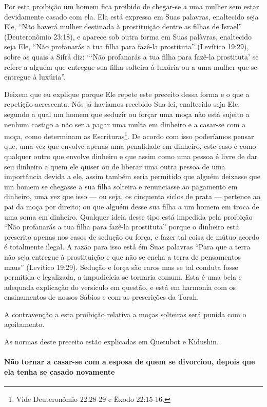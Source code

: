 Por esta proibição um homem fica proibido de chegar-se a uma mulher sem
estar devidamente casado com ela. Ela está expressa em Suas palavras,
enaltecido seja Ele, ``Não haverá mulher destinada à prostituição dentre
as filhas de Israel'' (Deuteronômio 23:18), e aparece sob outra forma
em Suas palàvras, enaltecido seja Ele, ``Não profanarás a tua filha
para fazê-la prostituta'' (Levítico 19:29), sobre as quais a Sifrá diz:
```Não profanarás a tua filha para fazê-la prostituta' se refere a
alguém que entregue sua filha solteira à luxúria ou a uma mulher que se
entregue à luxúria''.

Deixem que eu explique porque Ele repete este preceito dessa forma e o
que a repetição acrescenta. Nós já havíamos recebido Sua lei, enaltecido
seja Ele, segundo a qual um homem que seduzir ou forçar uma moça não
está sujeito a nenhum castigo a não ser a pagar uma multa em dinheiro e
a casar-se com a moça, como determinam as
Escrituras\footnote{Vide Deuteronômio 22:28-29 e Êxodo 22:15-16.}. De acordo com isso poderíamos pensar
que, uma vez que envolve apenas uma penalidade em dinheiro, este caso é
como qualquer outro que envolve dinheiro e que assim como uma pessoa é
livre de dar seu dinheiro a quem ele quiser ou de liberar uma outra
pessoa de uma importância devida a ele, assim também seria permitido que
alguém deixasse que um homem se chegasse a sua filha solteira e
renunciasse ao pagamento em dinheiro, uma vez que isso --- ou seja, os
cinquenta siclos de prata --- pertence ao pai da moça por direito; ou
que alguém desse sua filha a um homem em troca de uma soma em dinheiro.
Qualquer ideia desse tipo está impedida pela proibição ``Não profanarás
a tua filha para fazê-la prostituta'' porque o dinheiro está prescrito
apenas nos casos de sedução ou força, e fazer tal coisa de mútuo acordo
é totalmente ilegal. A razão para isso está ém Suas palavras ``Para que
a terra não seja entregue à prostituição e que não se encha a terra de
pensamentos maus'' (Levítico 19:29). Sedução e força são raros mas se
tal conduta fosse permitida e legalizada, a impudicícia se tornaria
comum. Esta é uma bela e adequada explicação do versículo em questão, e
está em harmonia com os ensinamentos de nossos Sábios e com as
prescrições da Torah.

A contravenção a esta proibição relativa a moças solteiras será punida
com o açoitamento.

As normas deste preceito estão explicadas em Quetubot e Kidushin.

\paragraph{Não tornar a casar-se com a esposa de quem se divorciou, depois que
ela tenha se casado novamente}

